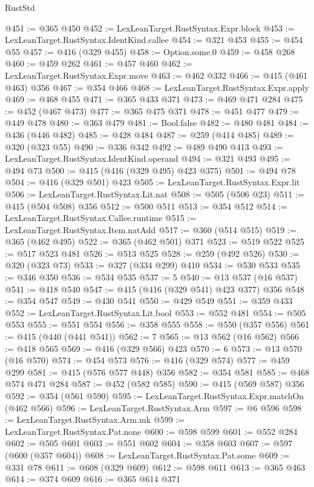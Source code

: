\begin{lexlean}{RustStd}
\begin{coremodule}
@451 := @365 @450
@452 := LexLeanTarget.RustSyntax.Expr.block
@453 := LexLeanTarget.RustSyntax.IdentKind.callee
@454 := @321 @453
@455 := @454 @55
@457 := @416 (@329 @455)
@458 := Option.some.{0}
@459 := @458 @268
@460 := @459 @262
@461 := @457 @460
@462 := LexLeanTarget.RustSyntax.Expr.move
@463 := @462 @332
@466 := @415 (@461 @463) @356
@467 := @354 @466
@468 := LexLeanTarget.RustSyntax.Expr.apply
@469 := @468 @455
@471 := @365 @433 @371
@473 := @469 @471 @284
@475 := @452 (@467 @473)
@477 := @365 @475 @371
@478 := @451 @477
@479 := @449 @478
@480 := @363 @479
@481 := Bool.false
@482 := @480 @481
@484 := @436 (@446 @482)
@485 := @428 @484
@487 := @259 (@414 @485)
@489 := @320 (@323 @55)
@490 := @336 @342
@492 := @489 @490 @413
@493 := LexLeanTarget.RustSyntax.IdentKind.operand
@494 := @321 @493
@495 := @494 @73
@500 := @415 (@416 (@329 @495) @423 @375)
@501 := @494 @78
@504 := @416 (@329 @501) @423
@505 := LexLeanTarget.RustSyntax.Expr.lit
@506 := LexLeanTarget.RustSyntax.Lit.nat
@508 := @505 (@506 @23)
@511 := @415 (@504 @508) @356
@512 := @500 @511
@513 := @354 @512
@514 := LexLeanTarget.RustSyntax.Callee.runtime
@515 := LexLeanTarget.RustSyntax.Item.natAdd
@517 := @360 (@514 @515)
@519 := @365 (@462 @495)
@522 := @365 (@462 @501) @371
@523 := @519 @522
@525 := @517 @523 @481
@526 := @513 @525
@528 := @259 (@492 @526)
@530 := @320 (@323 @73)
@533 := @327 (@334 @299) @410
@534 := @530 @533
@535 := @346 @350
@536 := @534 @535
@537 := 5
@540 := @13 @537 (@16 @537)
@541 := @418 @540
@547 := @415 (@416 (@329 @541) @423 @377) @356
@548 := @354 @547
@549 := @430 @541
@550 := @429 @549
@551 := @359 @433
@552 := LexLeanTarget.RustSyntax.Lit.bool
@553 := @552 @481
@554 := @505 @553
@555 := @551 @554
@556 := @358 @555
@558 := @550 (@357 @556)
@561 := @415 (@440 (@441 @541))
@562 := 7
@565 := @13 @562 (@16 @562)
@566 := @418 @565
@569 := @416 (@329 @566) @423
@570 := 6
@573 := @13 @570 (@16 @570)
@574 := @454 @573
@576 := @416 (@329 @574)
@577 := @459 @299
@581 := @415 (@576 @577 @448) @356
@582 := @354 @581
@585 := @468 @574 @471 @284
@587 := @452 (@582 @585)
@590 := @415 (@569 @587) @356
@592 := @354 (@561 @590)
@595 := LexLeanTarget.RustSyntax.Expr.matchOn (@462 @566)
@596 := LexLeanTarget.RustSyntax.Arm
@597 := @6 @596
@598 := LexLeanTarget.RustSyntax.Arm.mk
@599 := LexLeanTarget.RustSyntax.Pat.none
@600 := @598 @599
@601 := @552 @284
@602 := @505 @601
@603 := @551 @602
@604 := @358 @603
@607 := @597 (@600 (@357 @604))
@608 := LexLeanTarget.RustSyntax.Pat.some
@609 := @331 @78
@611 := @608 (@329 @609)
@612 := @598 @611
@613 := @365 @463
@614 := @374 @609
@616 := @365 @614 @371

\end{coremodule}
\end{lexlean}

